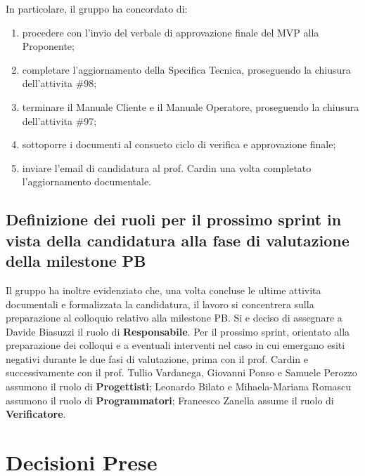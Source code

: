 \documentclass[a4paper, 11pt, oneside]{scrartcl}
\begin{document}
In particolare, il gruppo ha concordato di:
\begin{enumerate}[noitemsep, topsep=3pt]
	\item procedere con l'invio del verbale di approvazione finale del MVP alla Proponente;
	\item completare l'aggiornamento della Specifica Tecnica, proseguendo la chiusura dell'attivita \#98;
	\item terminare il Manuale Cliente e il Manuale Operatore, proseguendo la chiusura dell'attivita \#97;
	\item sottoporre i documenti al consueto ciclo di verifica e approvazione finale;
	\item inviare l'email di candidatura al prof. Cardin una volta completato l'aggiornamento documentale.
\end{enumerate}

\subsection{Definizione dei ruoli per il prossimo sprint in vista della candidatura alla fase di valutazione della milestone PB}
Il gruppo ha inoltre evidenziato che, una volta concluse le ultime attivita documentali e formalizzata la candidatura, il lavoro si concentrera sulla preparazione al colloquio relativo alla milestone PB.
Si e deciso di assegnare a Davide Biasuzzi il ruolo di \textbf{Responsabile}. Per il prossimo sprint, orientato alla preparazione dei colloqui e a eventuali interventi nel caso in cui emergano esiti negativi durante le due fasi di valutazione, prima con il prof. Cardin e successivamente con il prof. Tullio Vardanega, Giovanni Ponso e Samuele Perozzo assumono il ruolo di \textbf{Progettisti}; Leonardo Bilato e Mihaela-Mariana Romascu assumono il ruolo di \textbf{Programmatori};  Francesco Zanella assume il ruolo di \textbf{Verificatore}.

\newpage
\section{Decisioni Prese}
\end{document}
